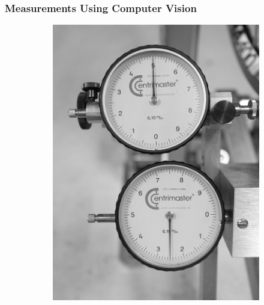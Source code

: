 \documentclass[mathserif]{beamer}
\begin{document}
\begin{frame}
    \frametitle{Measurements Using Computer Vision}
    \begin{figure}
        \centering
        \begin{subfigure}[b]{0.2\textwidth}
            \includegraphics[width=\textwidth]{ref}
            \caption{}
        \end{subfigure}
         \quad %
        \begin{subfigure}[b]{0.2\textwidth}

\end{subfigure}
\end{figure}
\end{frame}
\end{document}
